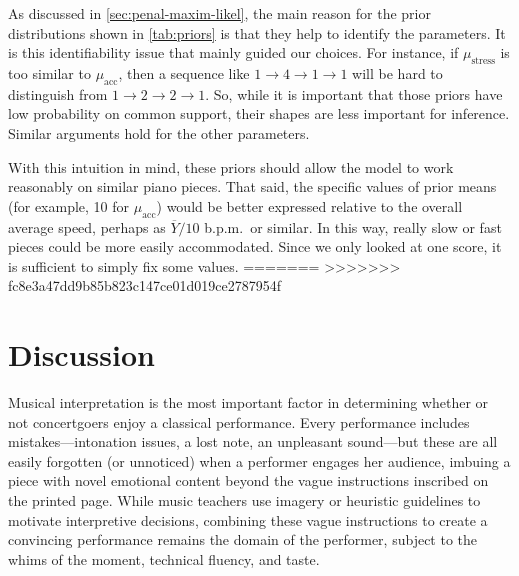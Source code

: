\documentclass[aoas]{imsart}
\begin{document}
As discussed in \autoref{sec:penal-maxim-likel}, the main reason for the prior distributions shown in
\autoref{tab:priors} is that they help to identify the
parameters. It is this identifiability issue that mainly guided our
choices. For instance, if $\mu_{\mbox{stress}}$ is too similar to
$\mu_{\mbox{acc}}$, then a sequence like $1\rightarrow 4 \rightarrow
1 \rightarrow 1$ will be hard to distinguish from $1\rightarrow 2
\rightarrow 2 \rightarrow 1$. So, while it is important that those
priors have low probability on common support, their shapes are less important for
inference. Similar arguments hold for the other parameters.

With this intuition in mind, these priors should allow the model to
work reasonably on similar piano pieces. That said, the specific
values of prior means (for example, 10 for $\mu_{\mbox{acc}}$)
would be better expressed relative to the overall average speed,
perhaps as $\overline{Y}/10$ b.p.m.\ or similar. In this way, really
slow or fast pieces could be more easily accommodated. Since we only looked at one
score, it is sufficient to simply fix some values. 
=======
>>>>>>> fc8e3a47dd9b85b823c147ce01d019ce2787954f

\section{Discussion}
\label{sec:discussion}


Musical interpretation is the most important factor 
in determining whether or not concertgoers enjoy a classical performance. Every
performance includes mistakes---intonation issues, a lost note, an
unpleasant sound---but these are all easily forgotten (or unnoticed) when a performer
engages her audience, imbuing a piece with novel emotional content
beyond the vague instructions inscribed on the printed page. While music teachers use
imagery or heuristic guidelines to motivate interpretive decisions, combining these
vague instructions to create a convincing performance remains the domain
of the performer, subject to the whims of the moment, technical
fluency, and taste.
\end{document}

